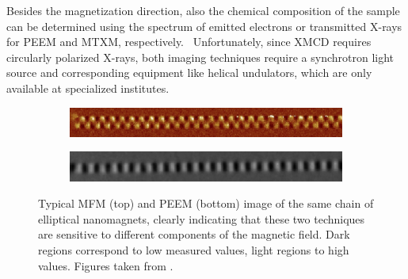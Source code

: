 \documentclass[12pt,a4paper]{article}
\begin{document}
Besides the magnetization direction, also the chemical composition of the sample can be determined using the spectrum of emitted electrons or transmitted X-rays for PEEM and MTXM, respectively.~\cite{PEEM,Imaging_MTXM} Unfortunately, since XMCD requires circularly polarized X-rays, both imaging techniques require a synchrotron light source and corresponding equipment like helical undulators, which are only available at specialized institutes.

\begin{figure}
     \centering
     \begin{subfigure}[b]{0.8\textwidth}
         \centering
         \includegraphics[width=\textwidth]{Figures/Introduction/NML_Carlton - Figure 1.15 cropped.png}
     \end{subfigure}
     \begin{subfigure}[b]{0.8\textwidth}
         \centering
         \includegraphics[width=\textwidth]{Figures/Introduction/NML_Carlton - Figure 1.17 cropped.png}
     \end{subfigure}
     \caption{Typical MFM (top) and PEEM (bottom) image of the same chain of elliptical nanomagnets, clearly indicating that these two techniques are sensitive to different components of the magnetic field. Dark regions correspond to low measured values, light regions to high values. Figures taken from \cite{NML_Carlton}.}
     \label{fig:Intro_Imaging}
\end{figure} %
\end{document}
